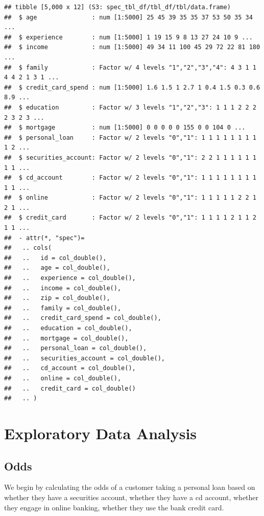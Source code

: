 \documentclass[
]{article}
\newenvironment{Shaded}{\begin{snugshade}}{\end{snugshade}}
\newcommand{\CommentTok}[1]{\textcolor[rgb]{0.00,0.40,1.00}{\textbf{\textit{#1}}}}
\newcommand{\DataTypeTok}[1]{\textcolor[rgb]{0.74,0.68,0.62}{\underline{#1}}}
\newcommand{\KeywordTok}[1]{\textcolor[rgb]{0.26,0.66,0.93}{\textbf{#1}}}
\newcommand{\NormalTok}[1]{\textcolor[rgb]{0.74,0.68,0.62}{#1}}
\newcommand{\OperatorTok}[1]{\textcolor[rgb]{0.74,0.68,0.62}{#1}}
\newcommand{\StringTok}[1]{\textcolor[rgb]{0.02,0.61,0.04}{#1}}
\begin{document}
\begin{verbatim}
## tibble [5,000 x 12] (S3: spec_tbl_df/tbl_df/tbl/data.frame)
##  $ age               : num [1:5000] 25 45 39 35 35 37 53 50 35 34 ...
##  $ experience        : num [1:5000] 1 19 15 9 8 13 27 24 10 9 ...
##  $ income            : num [1:5000] 49 34 11 100 45 29 72 22 81 180 ...
##  $ family            : Factor w/ 4 levels "1","2","3","4": 4 3 1 1 4 4 2 1 3 1 ...
##  $ credit_card_spend : num [1:5000] 1.6 1.5 1 2.7 1 0.4 1.5 0.3 0.6 8.9 ...
##  $ education         : Factor w/ 3 levels "1","2","3": 1 1 1 2 2 2 2 3 2 3 ...
##  $ mortgage          : num [1:5000] 0 0 0 0 0 155 0 0 104 0 ...
##  $ personal_loan     : Factor w/ 2 levels "0","1": 1 1 1 1 1 1 1 1 1 2 ...
##  $ securities_account: Factor w/ 2 levels "0","1": 2 2 1 1 1 1 1 1 1 1 ...
##  $ cd_account        : Factor w/ 2 levels "0","1": 1 1 1 1 1 1 1 1 1 1 ...
##  $ online            : Factor w/ 2 levels "0","1": 1 1 1 1 1 2 2 1 2 1 ...
##  $ credit_card       : Factor w/ 2 levels "0","1": 1 1 1 1 2 1 1 2 1 1 ...
##  - attr(*, "spec")=
##   .. cols(
##   ..   id = col_double(),
##   ..   age = col_double(),
##   ..   experience = col_double(),
##   ..   income = col_double(),
##   ..   zip = col_double(),
##   ..   family = col_double(),
##   ..   credit_card_spend = col_double(),
##   ..   education = col_double(),
##   ..   mortgage = col_double(),
##   ..   personal_loan = col_double(),
##   ..   securities_account = col_double(),
##   ..   cd_account = col_double(),
##   ..   online = col_double(),
##   ..   credit_card = col_double()
##   .. )
\end{verbatim}

\pagebreak

\hypertarget{exploratory-data-analysis}{%
\section{Exploratory Data Analysis}\label{exploratory-data-analysis}}

\hypertarget{odds}{%
\subsection{Odds}\label{odds}}

We begin by calculating the odds of a customer taking a personal loan
based on whether they have a securities account, whether they have a cd
account, whether they engage in online banking, whether they use the
bank credit card.

\begin{Shaded}
\end{Shaded}
\end{document}

